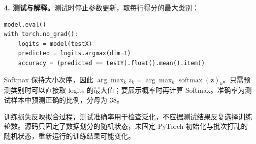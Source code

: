 \begin{checkedsolution}
\textbf{4. 测试与解释。}测试时停止参数更新，取每行得分的最大类别：
\begingroup\small\linespread{1.05}\selectfont
\begin{verbatim}
model.eval()
with torch.no_grad():
    logits = model(testX)
    predicted = logits.argmax(dim=1)
    accuracy = (predicted == testY).float().mean().item()
\end{verbatim}
\endgroup
Softmax 保持大小次序，因此 $\arg\max_k z_k=\arg\max_k\operatorname{softmax}(\mathbf z)_k$。只需预测类别时可以直接取 logits 的最大值；要展示概率时再计算 Softmax。准确率为测试样本中预测正确的比例，分母为 38。

训练损失反映拟合过程，测试准确率用于检查泛化，不应据测试结果反复选择训练轮数。源码只固定了数据划分的随机状态，未固定 PyTorch 初始化与批次打乱的随机状态，重新运行的训练结果可能变化。
\end{checkedsolution}
\endgroup
